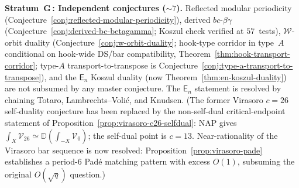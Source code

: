 \begin{remark}
\smallskip\noindent
\textbf{Stratum~G\,: Independent conjectures \textup{(}${\sim}7$\textup{)}.}
Reflected modular periodicity
\textup{(}Conjecture~\ref{conj:reflected-modular-periodicity}\textup{)},
derived $bc$-$\beta\gamma$
\textup{(}Conjecture~\ref{conj:derived-bc-betagamma}; Koszul check
verified at $57$~tests\textup{)},
$\mathcal{W}$-orbit duality
\textup{(}Conjecture~\ref{conj:w-orbit-duality}; hook-type corridor
in type~$A$ conditional on hook-wide DS/bar compatibility,
Theorem~\ref{thm:hook-transport-corridor};
type-$A$ transport-to-transpose is
Conjecture~\ref{conj:type-a-transport-to-transpose}\textup{)},
and the $\mathsf{E}_n$ Koszul duality
\textup{(}now Theorem~\ref{thm:en-koszul-duality}\textup{)} are not subsumed
by any master conjecture. The $\mathsf{E}_n$ statement is resolved by
chaining Totaro, Lambrechts--Voli\'c, and Knudsen.
\textup{(}The former Virasoro $c = 26$ self-duality conjecture has
been replaced by the non-self-dual critical-endpoint statement of
Proposition~\ref{prop:virasoro-c26-selfdual}: NAP gives
$\int_X \mathcal{V}_{26} \simeq \mathbb{D}(\int_{-X}\mathcal{V}_0)$;
the self-dual point is $c = 13$. Near-rationality of the Virasoro bar sequence is now resolved:
Proposition~\ref{prop:virasoro-pade} establishes a period-$6$
Pad\'e matching pattern with excess $O(1)$, subsuming the original
$O(\sqrt{q})$ question.\textup{)}
\end{remark}


